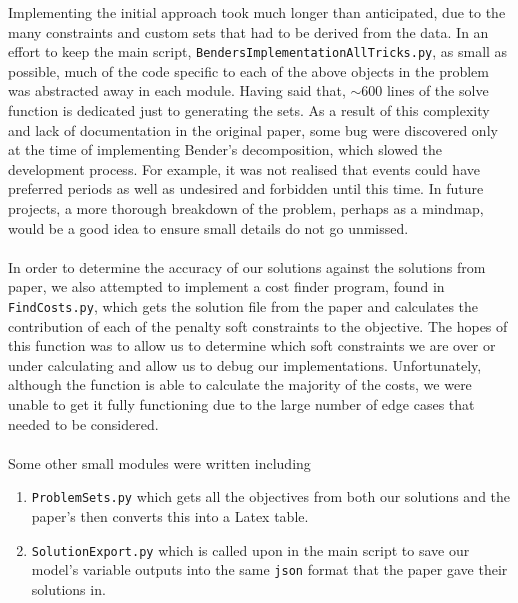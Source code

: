 \documentclass{article}
\newcommand{\inlinecode}[1]{\colorbox{gray!20}{\texttt{#1}}}
\begin{document}
Implementing the initial approach took much longer than anticipated, due to the many constraints and custom sets that had to be derived from the data. In an effort to keep the main script, \inlinecode{BendersImplementationAllTricks.py}, as small as possible, much of the code specific to each of the above objects in the problem was abstracted away in each module. Having said that, $\sim 600$ lines of the solve function is dedicated just to generating the sets. As a result of this complexity and lack of documentation in the original paper, some bug were discovered only at the time of implementing Bender's decomposition, which slowed the development process. For example, it was not realised that events could have preferred periods as well as undesired and forbidden until this time. In future projects, a more thorough breakdown of the problem, perhaps as a mindmap, would be a good idea to ensure small details do not go unmissed. \\
\\
In order to determine the accuracy of our solutions against the solutions from paper, we also attempted to implement a cost finder program, found in \inlinecode{FindCosts.py}, which gets the solution file from the paper and calculates the contribution of each of the penalty soft constraints to the objective. The hopes of this function was to allow us to determine which soft constraints we are over or under calculating and allow us to debug our implementations. Unfortunately, although the function is able to calculate the majority of the costs, we were unable to get it fully functioning due to the large number of edge cases that needed to be considered. \\
\\
Some other small modules were written including
\begin{enumerate}
    \item \inlinecode{ProblemSets.py} which gets all the objectives from both our solutions and the paper's then converts this into a Latex table.
    \item \inlinecode{SolutionExport.py} which is called upon in the main script to save our model's variable outputs into the same \texttt{json} format that the paper gave their solutions in. 
\end{enumerate}
\end{document}
